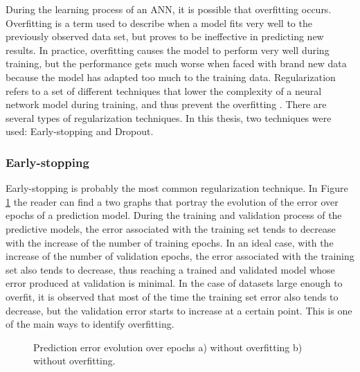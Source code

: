 During the learning process of an \ac{ANN}, it is possible that overfitting occurs. Overfitting is a term used to describe when a model fits very well to the previously observed data set, but proves to be ineffective in predicting new results. In practice, overfitting causes the model to perform very well during training, but the performance gets much worse when faced with brand new data because the model has adapted too much to the training data.  Regularization refers to a set of different techniques that lower the complexity of a neural network model during training, and thus prevent the overfitting \cite{reg0}. There are several types of regularization techniques. In this thesis, two techniques were used: Early-stopping and Dropout.

\subsubsection{Early-stopping}\label{sec:early}

Early-stopping is probably the most common regularization technique. In Figure \ref{early} the reader can find a two graphs that portray the evolution of the error over epochs of a prediction model. During the training and validation process of the predictive models, the error associated with the training set tends to decrease with the increase of the number of training epochs. In an ideal case, with the increase of the number of validation epochs, the error associated with the training set also tends to decrease, thus reaching a trained and validated model whose error produced at validation is minimal. In the case of datasets large enough to overfit, it is observed that most of the time the training set error also tends to decrease, but the validation error starts to increase at a certain point. This is one of the main ways to identify overfitting.

\begin{figure}[h!]
\captionsetup[subfigure]{position=b}
\centering
{}
\hspace{0.05\textwidth}
\caption{Prediction error evolution over epochs a) without overfitting b) without overfitting.}
\label{early}
\end{figure}

